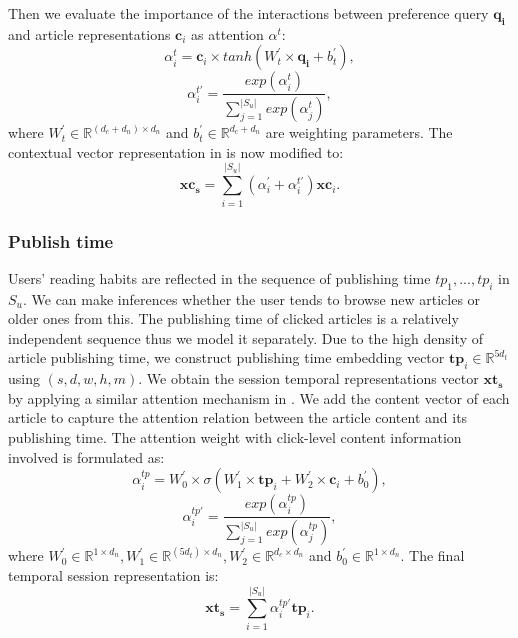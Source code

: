 Then we evaluate the importance of the interactions between preference query $\mathbf{q_i}$ and article representations $\mathbf{c}_i$ as attention $\alpha^{t}$:
\begin{equation}
    \alpha_i^{t} = \mathbf{c}_i \times tanh ( W_t^{\prime} \times \mathbf{q_i} + b_t^{\prime}),
\end{equation}
\begin{equation}
    \alpha_i^{t\prime} = \frac{exp(\alpha_i^{t})}{\sum_{j=1}^{|S_u|}exp(\alpha_j^{t})},
\end{equation}
where $W_t^{\prime} \in \mathbb{R}^{(d_c+d_n)\times d_n}$ and $b_t^{\prime} \in \mathbb{R}^{d_c+d_n}$ are weighting parameters. The contextual vector representation in  is now modified to:
\begin{equation}
    \mathbf{xc_s} = \sum_{i=1}^{|S_u|} (\alpha_i^{\prime}+\alpha_i^{t\prime}) \mathbf{xc}_i.
\end{equation}

\subsubsection{Publish time}
Users' reading habits are reflected in the sequence of publishing time ${tp_1,...,tp_i}$ in $S_u$. We can make inferences whether the user tends to browse new articles or older ones from this. The publishing time of clicked articles is a relatively independent sequence thus we model it separately. Due to the high density of article publishing time, we construct publishing time embedding vector $\mathbf{tp}_i\in \mathbb{R}^{5d_t}$ using $(s, d, w, h, m)$. We obtain the session temporal representations vector $\mathbf{xt_s}$ by applying a similar attention mechanism in . We add the content vector of each article to capture the attention relation between the article content and its publishing time. The attention weight with click-level content information involved is formulated as:
\begin{equation}
    \alpha_i^{tp} = W_0^{\prime} \times \sigma (W_1^{\prime} \times \mathbf{tp}_i + W_2^{\prime} \times \mathbf{c}_i + b_0^{\prime}),
\end{equation}
\begin{equation}
    \alpha_i^{tp\prime} = \frac{exp(\alpha_i^{tp})}{\sum_{j=1}^{|S_u|}exp(\alpha_j^{tp})},
\end{equation}
where $W_0^{\prime}\in \mathbb{R}^{1 \times d_n}, W_1^{\prime} \in \mathbb{R}^{(5d_t)\times d_n}, W_2^{\prime} \in \mathbb{R}^{d_c\times d_n}$ and $b_0^{\prime} \in \mathbb{R}^{1 \times d_n}$. The final temporal session representation is:
\begin{equation}
    \mathbf{xt_s} = \sum_{i=1}^{|S_u|} \alpha_i^{tp\prime} \mathbf{tp}_i.
\end{equation}

